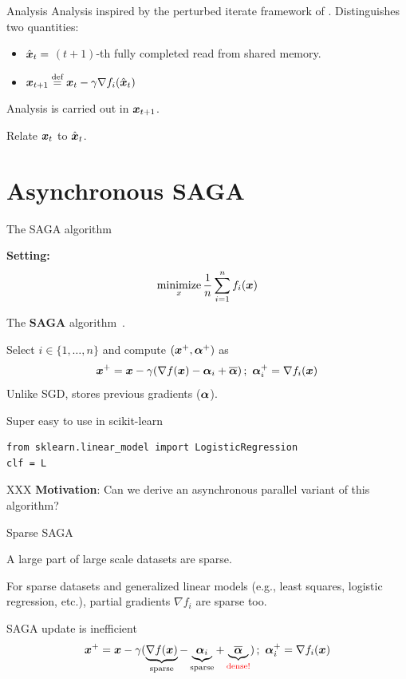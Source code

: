 \documentclass[10pt]{beamer}
\let\oldparencite=\parencite
\renewcommand{\parencite}[1]{\textcolor[rgb]{.7,.7,.7}{\oldparencite{#1}}}
\begin{document}
\begin{frame}{Analysis}
Analysis inspired by the perturbed iterate framework of \parencite{mania2015perturbed}. Distinguishes two quantities:
\begin{itemize}
\item $\hat{{\boldsymbol x}}_t =$ $(t+1)$-th fully completed read from shared memory. 
\item ${\boldsymbol x}_{t+1} \stackrel{\text{def}}{=} {\boldsymbol x}_{t} - \gamma \nabla f_i(\hat{{\boldsymbol x}}_t)$
\end{itemize}

Analysis is carried out in ${\boldsymbol x}_{t+1}$.

Relate ${\boldsymbol x}_t$ to $\hat{{\boldsymbol x}}_t$.
\end{frame}

\section{Asynchronous SAGA}


\begin{frame}{The SAGA algorithm}

{\bfseries Setting:}
$$
\operatorname*{minimize}_x \frac{1}{n} \sum_{i=1}^n f_i({\boldsymbol x})
$$ 

The {\bfseries SAGA} algorithm~\parencite{defazio2014saga}.

Select $i \in \{1, \ldots, n\}$ and compute $({\boldsymbol x}^+, {\boldsymbol \alpha}^+)$ as
$$
{\boldsymbol x}^+ = {\boldsymbol x} - \gamma (\nabla f({\boldsymbol x}) - {\boldsymbol \alpha}_i + \overline{{\boldsymbol \alpha}})\,;~{\boldsymbol \alpha}_i^+ = \nabla f_i({\boldsymbol x})
$$
Unlike SGD, stores previous gradients (${\boldsymbol \alpha}$).
\vspace{1em}\pause

\begin{alertblock}{Super easy to use in scikit-learn}
\begin{verbatim}
from sklearn.linear_model import LogisticRegression
clf = L
\end{verbatim}
\end{alertblock}
\end{frame}


\begin{frame}{XXX}
{\bfseries Motivation}: Can we derive an asynchronous parallel variant of this algorithm?

\end{frame}

\begin{frame}{Sparse SAGA}

A large part of large scale datasets are sparse.

\vspace{1em}
For sparse datasets and generalized linear models (e.g., least squares, logistic regression, etc.), partial gradients $\nabla f_i$ are sparse too.

\vspace{1em}
SAGA update is inefficient
$$
{\boldsymbol x}^+ = {\boldsymbol x} - \gamma (\underbrace{\nabla f({\boldsymbol x})}_{\text{sparse}} - \underbrace{{\boldsymbol \alpha}_i}_{\text{sparse}} + \underbrace{\overline{{\boldsymbol \alpha}}}_{\color{red}\text{dense!}})\,;~{\boldsymbol \alpha}_i^+ = \nabla f_i({\boldsymbol x})
$$

\end{frame}
\end{document}
